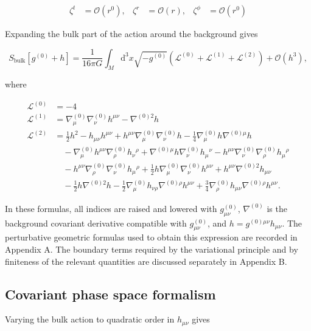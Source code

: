 \begin{align}
\zeta ^{t} & =\mathcal{O}(r^{0}), & \zeta ^{r} & =\mathcal{O}(r), & \zeta ^{\phi} & =\mathcal{O}(r^{0})
\end{align}

Expanding the bulk part of the action around the background gives

\[
S_{\mathrm{bulk}}[g^{(0)}+h]
=\frac{1}{16\pi G}\int_M\mathrm{d}^3x\sqrt{-g^{(0)}}
\left(\mathcal{L}^{(0)}+\mathcal{L}^{(1)}+\mathcal{L}^{(2)}\right)
+\mathcal{O}(h^3),
\]

where

\begin{align}
\mathcal{L}^{(0)} & =-4 \\
\mathcal{L}^{(1)} & =\nabla ^{(0)}_{\mu}\nabla ^{(0)}_{\nu}h^{\mu \nu}-\nabla ^{(0)2}h \\
\mathcal{L}^{(2)}&=\frac{1}{2}h^2-h_{\mu\nu}h^{\mu\nu}+h^{\mu\nu}\nabla^{(0)}_\mu\nabla^{(0)}_\nu h-\frac{1}{4}\nabla^{(0)}_\mu h\nabla^{(0)\mu}h\\
&\quad-\nabla^{(0)}_\mu h^{\mu\nu}\nabla^{(0)}_\rho h_\nu{}^\rho+\nabla^{(0)\mu}h\nabla^{(0)}_\nu h_\mu{}^\nu-h^{\mu\nu}\nabla^{(0)}_\nu\nabla^{(0)}_\rho h_\mu{}^\rho\\
&\quad-h^{\mu\nu}\nabla^{(0)}_\rho\nabla^{(0)}_\nu h_\mu{}^\rho+\frac{1}{2}h\nabla^{(0)}_\mu\nabla^{(0)}_\nu h^{\mu\nu}+h^{\mu\nu}\nabla^{(0)2}h_{\mu\nu}\\
&\quad-\frac{1}{2}h\nabla^{(0)2}h-\frac{1}{2}\nabla^{(0)}_\mu h_{\nu\rho}\nabla^{(0)\rho}h^{\mu\nu}+\frac{3}{4}\nabla^{(0)}_\rho h_{\mu\nu}\nabla^{(0)\rho}h^{\mu\nu}.
\end{align}

In these formulas, all indices are raised and lowered with \(g^{(0)}_{\mu \nu}\), \(\nabla ^{(0)}\) is the background covariant derivative compatible with \(g^{(0)}_{\mu \nu}\), and \(h=g^{(0)\mu \nu}h_{\mu \nu}\). The perturbative geometric formulas used to obtain this expression are recorded in Appendix A. The boundary terms required by the variational principle and by finiteness of the relevant quantities are discussed separately in Appendix B.

\subsection{Covariant phase space formalism}\label{covariant-phase-space-formalism}

Varying the bulk action to quadratic order in \(h_{\mu \nu}\) gives

